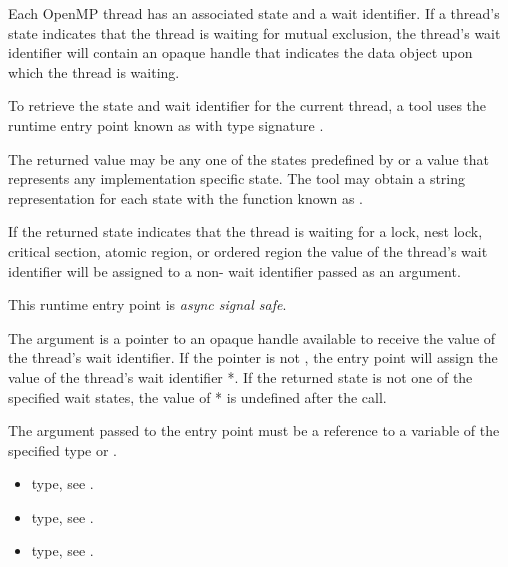 \descr

Each OpenMP thread has an associated state and a wait identifier.  If
a thread's state indicates that the thread is waiting for mutual
exclusion, the thread's wait identifier will contain an opaque handle
that indicates the data object upon which the thread is waiting.

To retrieve the state and wait identifier for the current thread,
a tool uses the runtime entry point known as
 with type signature .

The returned value may be any one of the states predefined by
 or a value that represents any implementation 
specific state. 
The tool may obtain a string representation for each state with the
function known as .

If the returned state indicates that the thread is waiting for a
lock, nest lock, critical section, atomic region, or ordered region
the value of the thread's wait identifier will be assigned to a
non- wait identifier passed as an argument.

This runtime entry point is \emph{async signal safe}.

\argdesc

The argument  is a pointer to an opaque handle
available to receive the value of the thread's wait identifier.  If
the  pointer is not , the entry point
will assign the value of the thread's wait identifier
*.  If the returned state is not one of the specified
wait states, the value of * is undefined after the call.

\constraints
The argument passed to the entry point must be a reference
to a variable of the specified type or .

\crossreferences
\begin{itemize}
\item {} type, see .
\item {} type, see .
\item {} type, see .
\end{itemize}


\label{sec:ompt_get_parallel_info_t}
\label{sec:ompt_get_parallel_info}

\summary


